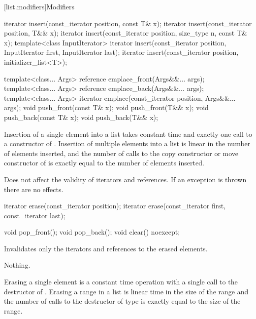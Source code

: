 [list.modifiers]{Modifiers}

%
\begin{itemdecl}
iterator insert(const_iterator position, const T& x);
iterator insert(const_iterator position, T&& x);
iterator insert(const_iterator position, size_type n, const T& x);
template<class InputIterator>
  iterator insert(const_iterator position, InputIterator first,
                  InputIterator last);
iterator insert(const_iterator position, initializer_list<T>);

template<class... Args> reference emplace_front(Args&&... args);
template<class... Args> reference emplace_back(Args&&... args);
template<class... Args> iterator emplace(const_iterator position, Args&&... args);
void push_front(const T& x);
void push_front(T&& x);
void push_back(const T& x);
void push_back(T&& x);
\end{itemdecl}

\begin{itemdescr}
\pnum
\complexity
Insertion of a single element into a list takes constant time and
exactly one call to a constructor of
. Insertion of multiple elements into a list is linear in the
number of elements inserted, and the number of calls to the copy
constructor or move constructor of  is exactly equal
to the number of elements inserted.

\pnum
\remarks
Does not affect the validity of iterators and references.
If an exception is thrown there are no effects.
\end{itemdescr}

%
\begin{itemdecl}
iterator erase(const_iterator position);
iterator erase(const_iterator first, const_iterator last);

void pop_front();
void pop_back();
void clear() noexcept;
\end{itemdecl}

\begin{itemdescr}
\pnum
\effects
Invalidates only the iterators and references to the erased elements.

\pnum
\throws
Nothing.

\pnum
\complexity
Erasing a single element is a constant time operation with a single call to the destructor of
.
Erasing a range in a list is linear time in the
size of the range and the number of calls to the destructor of type
is exactly equal to the size of the range.
\end{itemdescr}

